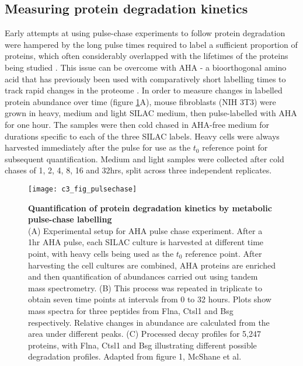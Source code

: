 \documentclass[a4paper,11pt,twoside,openright]{scrbook}
\begin{document}
\subsection{Measuring protein degradation kinetics}
Early attempts at using pulse-chase experiments to follow protein degradation
were hampered by the long pulse times required to label a sufficient proportion
of proteins, which often considerably overlapped with the lifetimes of the
proteins being studied \cite{Larance2013}. This issue can be overcome with AHA -
a bioorthogonal amino acid that has previously been used with comparatively
short labelling times to track rapid changes in the proteome
\cite{Eichelbaum2014}. In order to measure changes in labelled protein abundance
over time (figure \ref{figure:pulsechase}A), mouse fibroblasts (NIH 3T3) were
grown in heavy, medium and light SILAC medium, then pulse-labelled with AHA for
one hour. The samples were then cold chased in AHA-free medium for durations
specific to each of the three SILAC labels. Heavy cells were always harvested
immediately after the pulse for use as the $t_{0}$ reference point for
subsequent quantification. Medium and light samples were collected after cold
chases of 1, 2, 4, 8, 16 and 32hrs, split across three independent replicates.

\begin{figure}
    \texttt{[image: c3\_fig\_pulsechase]}
    \caption[Quantification of protein degradation kinetics by metabolic
    pulse-chase labelling]{\sffamily \textbf{Quantification of protein
    degradation kinetics by metabolic pulse-chase labelling} \\ \small (A)
    Experimental setup for AHA pulse chase experiment. After a 1hr AHA pulse,
    each SILAC culture is harvested at different time point, with heavy cells
    being used as the $t_{0}$ reference point. After harvesting the cell
    cultures are combined, AHA proteins are enriched and then quantification of
    abundances carried out using tandem mass spectrometry. (B) This process was
    repeated in triplicate to obtain seven time points at intervals from 0 to 32
    hours. Plots show mass spectra for three peptides from Flna, Ctsl1 and Bsg
    respectively. Relative changes in abundance are calculated from the area
    under different peaks. (C) Processed decay profiles for 5,247 proteins, with
    Flna, Ctsl1 and Bsg illustrating different possible degradation profiles.
    Adapted from figure 1, McShane et al.\cite{McShane2016}}
    \label{figure:pulsechase}
\end{figure}
\end{document}
